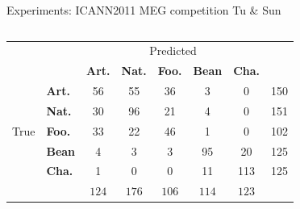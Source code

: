 \documentclass[aspectratio=169]{beamer}
\begin{document}
\begin{frame}{Experiments: ICANN2011 MEG competition}
  Tu \& Sun
\begin{columns}
  \begin{column}{0.7\linewidth}
      \begin{tabular}{l|l|c|c|c|c|c|c}
        \multicolumn{2}{c}{}&\multicolumn{5}{c}{Predicted}&\\
        \cline{3-7}
        \multicolumn{2}{c|}{}&\textbf{Art.}&\textbf{Nat.}&\textbf{Foo.}&\textbf{Bean}&\textbf{Cha.}&\multicolumn{1}{c}{}\\
        \cline{2-7}
        \multirow{5}{*}{True}& \textbf{Art.} & 56&   55&   36&    3&    0& 150\\
        \cline{2-7}
        & \textbf{Nat.} & 30&   96&   21&    4&    0& 151\\
        \cline{2-7}
        & \textbf{Foo.} & 33&   22&   46&    1&    0& 102\\
        \cline{2-7}
        & \textbf{Bean} &  4&    3&    3&   95&   20& 125\\
        \cline{2-7}
        & \textbf{Cha.} &  1&    0&    0&   11&  113& 125\\
        \cline{2-7}
        \multicolumn{1}{c}{} & \multicolumn{1}{c}{} & \multicolumn{1}{c}{$124$} & \multicolumn{1}{c}{$176$} & \multicolumn{1}{c}{$106$} & \multicolumn{1}{c}{$114$} & \multicolumn{1}{c}{$123$} & \multicolumn{1}{c}{}\\
      \end{tabular}          
  \end{column}
  \begin{column}{0.32\linewidth}
  \end{column}
\end{columns}
\end{frame}
\end{document}
